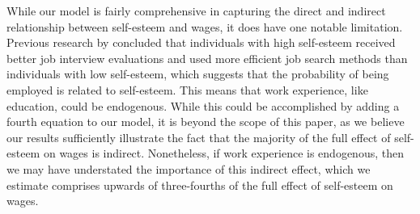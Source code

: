 \documentclass[12pt]{report}
\newcommand{\citee}[1]{\citename{#1} \citeyear{#1}}
\begin{document}
While our model is fairly comprehensive in capturing the direct and indirect relationship between self-esteem and wages, it does have one notable limitation. Previous research by \citee{ET1983} concluded that individuals with high self-esteem received better job interview evaluations and used more efficient job search methods than individuals with low self-esteem, which suggests that the probability of being employed is related to self-esteem. This means that work experience, like education, could be endogenous. While this could be accomplished by adding a fourth equation to our model, it is beyond the scope of this paper, as we believe our results sufficiently illustrate the fact that the majority of the full effect of self-esteem on wages is indirect. Nonetheless, if work experience is endogenous, then we may have understated the importance of this indirect effect, which we estimate comprises upwards of three-fourths of the full effect of self-esteem on wages.

\begin{comment}However, our model may be flawed because education and self-esteem are not likely the only endogenous explanatory variables for real wages., and a 1998 US Census Survey found "attitude" to be the most important factor in hiring decisions (Bureau of the Census - see \citee{BGO2001} for citation). Therefore, it seems plausible that self-esteem could significantly impact the probability of being employed, which is closely linked to work experience. Work experience could be treated as endogenous in the framework of our model by adding a fourth equation, which uses experience as the dependent variable and includes self-esteem as an independent variable. If this relationship is significant, then we may have understated the magnitude of the indirect effect of self-esteem on wages. Additionally, on the econometric front, further study is needed to determine the best methods for utilizing subjective response data in regression analysis.\end{comment}






\begin{comment} summary of results and recommendations for further study \end{comment}



\newpage
\end{document}
